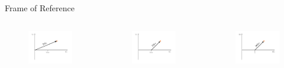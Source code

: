 \documentclass{beamer}
\begin{document}
\begin{frame}{Frame of Reference}
\begin{columns}
	\column[]{5cm}
	\vspace{-1cm}
	\begin{figure}
		\includegraphics[scale=2.0]{Pics/vspace_sc_trans.pdf}
	\end{figure}
	\vspace{-1cm}
	\begin{figure}
		\includegraphics[scale=2]{Pics/vspace_sw_trans.pdf}
	\end{figure}
	
	
	\column[]{6.2cm}
	\vspace{3.5cm}
	\begin{figure}
		\includegraphics[scale=2]{Pics/wspace_sw_trans.pdf}
	\end{figure}
\end{columns}
\end{frame}


%
%
%
\end{document}
